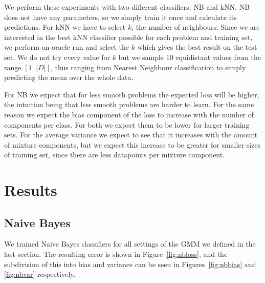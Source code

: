 \documentclass[a4paper]{article}
\begin{document}
We perform these experiments with two different classifiers: \ac{NB} and \ac{kNN}. \ac{NB} does not have any parameters, so we simply train it once and calculate its predictions. For \ac{kNN} we have to select $k$, the number of neighbours. Since we are interested in the best \ac{kNN} classifier possible for each problem and training set, we perform an oracle run and select the $k$ which gives the best result on the test set. We do not try every value for $k$ but we sample 10 equidistant values from the range $[1 .. |D|]$, thus ranging from Nearest Neighbour classification to simply predicting the mean over the whole data.

For \ac{NB} we expect that for less smooth problems the expected loss will be higher, the intuition being that less smooth problems are harder to learn. For the same reason we expect the bias component of the loss to increase with the number of components per class. For both we expect them to be lower for larger training sets. For the average variance we expect to see that it increases with the amount of mixture components, but we expect this increase to be greater for smaller sizes of training set, since there are less datapoints per mixture component.

\section{Results}
\label{sec:results}

\subsection{Naive Bayes}
We trained Naive Bayes classifiers for all settings of the \ac{GMM} we defined in the last section. The resulting error is shown in Figure~\ref{fig:nbloss}, and the subdivision of this into bias and variance can be seen in Figures~\ref{fig:nbbias} and \ref{fig:nbvar} respectively.
\end{document}
